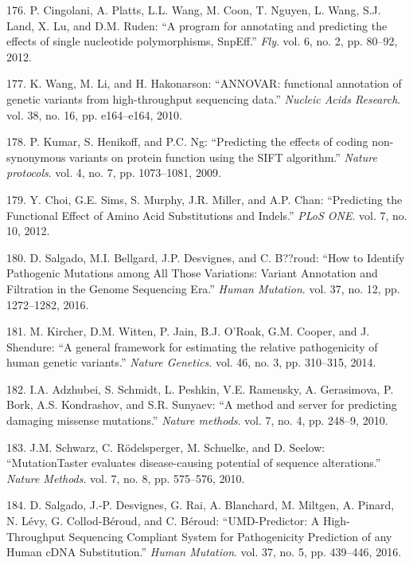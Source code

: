 \documentclass[12pt,a4paper,twoside]{ugathesis}
\theoremstyle{definition}
\theoremstyle{definition}
\theoremstyle{definition}
\theoremstyle{remark}
\begin{document}
\hypertarget{ref-Cingolani2012}{}
176. P. Cingolani, A. Platts, L.L. Wang, M. Coon, T. Nguyen, L. Wang,
S.J. Land, X. Lu, and D.M. Ruden: ``A program for annotating and
predicting the effects of single nucleotide polymorphisms, SnpEff.''
\emph{Fly}. vol. 6, no. 2, pp. 80--92, 2012.

\hypertarget{ref-Wang2010}{}
177. K. Wang, M. Li, and H. Hakonarson: ``ANNOVAR: functional annotation
of genetic variants from high-throughput sequencing data.''
\emph{Nucleic Acids Research}. vol. 38, no. 16, pp. e164--e164, 2010.

\hypertarget{ref-Kumar2009}{}
178. P. Kumar, S. Henikoff, and P.C. Ng: ``Predicting the effects of
coding non-synonymous variants on protein function using the SIFT
algorithm.'' \emph{Nature protocols}. vol. 4, no. 7, pp. 1073--1081,
2009.

\hypertarget{ref-Choi2012}{}
179. Y. Choi, G.E. Sims, S. Murphy, J.R. Miller, and A.P. Chan:
``Predicting the Functional Effect of Amino Acid Substitutions and
Indels.'' \emph{PLoS ONE}. vol. 7, no. 10, 2012.

\hypertarget{ref-Salgado2016}{}
180. D. Salgado, M.I. Bellgard, J.P. Desvignes, and C. B??roud: ``How to
Identify Pathogenic Mutations among All Those Variations: Variant
Annotation and Filtration in the Genome Sequencing Era.'' \emph{Human
Mutation}. vol. 37, no. 12, pp. 1272--1282, 2016.

\hypertarget{ref-Kircher2014}{}
181. M. Kircher, D.M. Witten, P. Jain, B.J. O'Roak, G.M. Cooper, and J.
Shendure: ``A general framework for estimating the relative
pathogenicity of human genetic variants.'' \emph{Nature Genetics}. vol.
46, no. 3, pp. 310--315, 2014.

\hypertarget{ref-Adzhubei2010}{}
182. I.A. Adzhubei, S. Schmidt, L. Peshkin, V.E. Ramensky, A.
Gerasimova, P. Bork, A.S. Kondrashov, and S.R. Sunyaev: ``A method and
server for predicting damaging missense mutations.'' \emph{Nature
methods}. vol. 7, no. 4, pp. 248--9, 2010.

\hypertarget{ref-Schwarz2010}{}
183. J.M. Schwarz, C. Rödelsperger, M. Schuelke, and D. Seelow:
``MutationTaster evaluates disease-causing potential of sequence
alterations.'' \emph{Nature Methods}. vol. 7, no. 8, pp. 575--576, 2010.

\hypertarget{ref-Salgado2016a}{}
184. D. Salgado, J.-P. Desvignes, G. Rai, A. Blanchard, M. Miltgen, A.
Pinard, N. Lévy, G. Collod-Béroud, and C. Béroud: ``UMD-Predictor: A
High-Throughput Sequencing Compliant System for Pathogenicity Prediction
of any Human cDNA Substitution.'' \emph{Human Mutation}. vol. 37, no. 5,
pp. 439--446, 2016.
\end{document}
